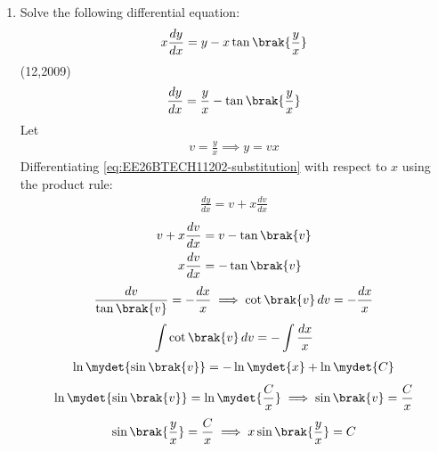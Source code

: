 \begin{enumerate}[label=\thesubsection.\arabic*, ref=\thesubsection.\theenumi]
\begin{align}
{         		0 & 1 & -1+p \\
         		0 & 3 & -2+3p} \\ \xrightarrow {R_3 \to R_3 - 3R_2} 
    	\mydet{1 & 1+p & 1+p+q \\
         		0 & 1 & -1+p \\
         		0 & 0 & 1}     
         \end{align}
         The determinant of upper triangular matrix is product of Diagonals
         \begin{align}
         	\Delta &= 1 \cdot \brak{1\cdot 1 - 0\cdot\brak{-1+p}} = 1
         \end{align}
         
         
 \item  Solve the following differential equation:
 $$x \frac{dy}{dx} = y - x \tan\brak{\frac{y}{x}}$$ \hfill{(12,2009)} \\
 \solution
 \begin{align}
 	\frac{dy}{dx} = \frac{y}{x} - \tan\brak{\frac{y}{x}}
 	\label{eq:EE26BTECH11202-de_standard}
 \end{align}
 Let 
 \begin{align}
 	v = \frac{y}{x} \implies y = v x
 	\label{eq:EE26BTECH11202-substitution}
 \end{align}
 Differentiating \eqref{eq:EE26BTECH11202-substitution} with respect to $x$ using the product rule:
 \begin{align}
 	\frac{dy}{dx} = v + x \frac{dv}{dx}
 	\label{eq:EE26BTECH11202-diff_sub}
 \end{align}
 \begin{align}
 	v + x \frac{dv}{dx} &= v - \tan\brak{v}
 	\\
 	x \frac{dv}{dx} &= -\tan\brak{v}
 \end{align}
 \begin{align}
 	\frac{dv}{\tan\brak{v}} = -\frac{dx}{x} \implies \cot\brak{v} \, dv = -\frac{dx}{x}
 	\label{eq:EE26BTECH11202-sep_vars}
 \end{align}
 \begin{align}
 	\int \cot\brak{v} \, dv = -\int \frac{dx}{x}
 \end{align}
 \begin{align}
 	\ln  \mydet{\sin\brak{v}} = -\ln \mydet{x} + \ln \mydet{C}
 \end{align}
 \begin{align}
 	\ln \mydet{\sin\brak{v}} = \ln \mydet{\frac{C}{x}} \implies \sin\brak{v} = \frac{C}{x}
 \end{align}
 \begin{align}
 	\sin\brak{\frac{y}{x}} = \frac{C}{x} \implies x \sin\brak{\frac{y}{x}} = C
 	\label{eq:EE26BTECH11202-implicit_general}
 \end{align}
 

\end{enumerate}
